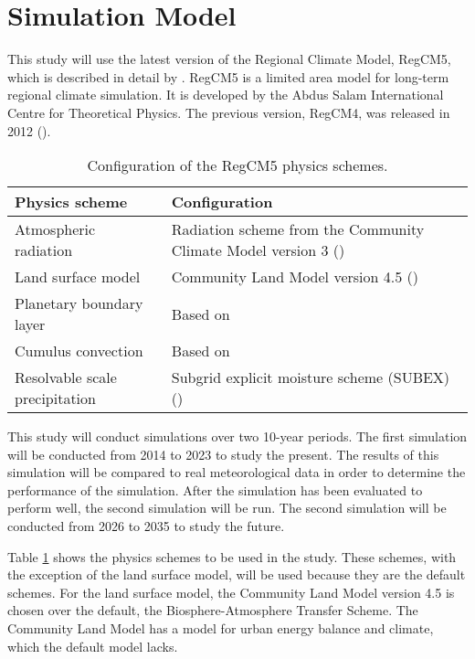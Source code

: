 \section{Simulation Model}
	This study will use the latest version of the Regional Climate Model, RegCM5, which is described in detail by \textcite{Giorgi2023}.
	RegCM5 is a limited area model for long-term regional climate simulation.
	It is developed by the Abdus Salam International Centre for Theoretical Physics.
	The previous version, RegCM4, was released in 2012 (\cite{Giorgi2012}).
	
	\begin{table}	
		\caption{Configuration of the RegCM5 physics schemes.}
		\label{tab:physics-schemes}
		\centering
		\begin{tabular}{p{2 in} p{2.75 in}}
			\hline \hline
			Physics scheme & Configuration\\
			\hline
			Atmospheric radiation & Radiation scheme from the Community Climate Model version 3 (\cite{Kiehl1996}) \\
			Land surface model & Community Land Model version 4.5 (\cite{Oleson2013})\\
			Planetary boundary layer & Based on \textcite{Holtslag1990}\\
			Cumulus convection & Based on \textcite{Emanuel1991}\\
			Resolvable scale precipitation & Subgrid explicit moisture scheme (SUBEX) (\cite{Pal2000})\\
			\hline
		\end{tabular}		
	\end{table}

	This study will conduct simulations over two 10-year periods.
	The first simulation will be conducted from 2014 to 2023 to study the present.
	The results of this simulation will be compared to real meteorological data in order to determine the performance of the simulation.
	After the simulation has been evaluated to perform well, the second simulation will be run.
	The second simulation will be conducted from 2026 to 2035 to study the future.
	
	Table \ref{tab:physics-schemes} shows the physics schemes to be used in the study.
	These schemes, with the exception of the land surface model, will be used because they are the default schemes. 
	For the land surface model, the Community Land Model version 4.5 is chosen over the default, the Biosphere-Atmosphere Transfer Scheme. 
	The Community Land Model has a model for urban energy balance and climate, which the default model lacks.
	
